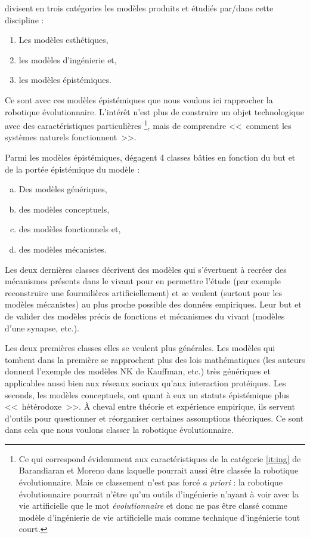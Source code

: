 \citet{barandiaran06alifemodelsasepistemicartefacts} divisent en trois catégories les modèles produits et étudiés par/dans cette discipline :
\begin{enumerate}
	\item Les modèles esthétiques, \label{it:est}
	\item les modèles d'ingénierie et,\label{it:ing}
	\item les modèles épistémiques. \label{it:epi}
\end{enumerate}

Ce sont avec ces modèles épistémiques que nous voulons ici rapprocher la robotique évolutionnaire. L'intérêt n'est plus de construire un objet technologique avec des caractéristiques particulières
\footnote{Ce qui correspond évidemment aux caractéristiques de la catégorie \ref{it:ing} de Barandiaran et Moreno dans laquelle pourrait aussi être classée la robotique évolutionnaire. Mais ce classement n'est pas forcé \emph{a priori} : la robotique évolutionnaire pourrait n'être qu'un outils d'ingénierie n'ayant à voir avec la vie artificielle que le mot \emph{évolutionnaire} et donc ne pas être classé comme modèle d'ingénierie de vie artificielle mais comme technique d'ingénierie tout court.},
mais de comprendre <<~comment les systèmes naturels fonctionnent~>>.

Parmi les modèles épistémiques, \citet{barandiaran06alifemodelsasepistemicartefacts} dégagent 4 classes bâties en fonction du but et de la portée épistémique du modèle :
\begin{enumerate}[(a)]
	\item Des modèles génériques, \label{it:gnx}
	\item des modèles conceptuels, \label{it:con}
	\item des modèles fonctionnels et,\label{it:fun}
	\item des modèles mécanistes. \label{it:mech}
\end{enumerate}

Les deux dernières classes décrivent des modèles qui s'évertuent à recréer des mécanismes présents dans le vivant pour en permettre l'étude (par exemple reconstruire une fourmilières artificiellement) et se veulent (surtout pour les modèles mécanistes) au plus proche possible des données empiriques. Leur but et de valider des modèles précis de fonctions et mécanismes du vivant (modèles d'une synapse, etc.). 

Les deux premières classes elles se veulent plus générales. Les modèles qui tombent dans la première se rapprochent plus des lois mathématiques (les auteurs donnent l'exemple des modèles NK de Kauffman, etc.) très génériques et applicables aussi bien aux réseaux sociaux qu'aux interaction protéiques. Les seconds, les modèles conceptuels, ont quant à eux un statuts épistémique plus <<~hétérodoxe~>>. À cheval entre théorie et expérience empirique, ils servent d'outils pour questionner et réorganiser certaines assomptions théoriques. Ce sont dans cela que nous voulons classer la robotique évolutionnaire.

